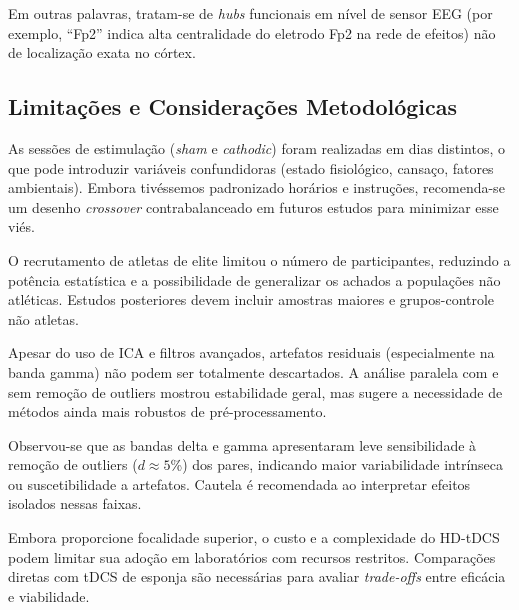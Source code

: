 Em outras palavras, tratam-se de \textit{hubs} funcionais em nível de sensor EEG (por exemplo, ``Fp2'' indica alta centralidade do eletrodo Fp2 na rede de efeitos) não de localização exata no córtex.

\subsection{Limitações e Considerações Metodológicas}
As sessões de estimulação (\textit{sham} e \textit{cathodic}) foram realizadas em dias distintos, o que pode introduzir variáveis confundidoras (estado fisiológico, cansaço, fatores ambientais). Embora tivéssemos padronizado horários e instruções, recomenda-se um desenho \textit{crossover} contrabalanceado em futuros estudos para minimizar esse viés.

O recrutamento de atletas de elite limitou o número de participantes, reduzindo a potência estatística e a possibilidade de generalizar os achados a populações não atléticas. Estudos posteriores devem incluir amostras maiores e grupos-controle não atletas.

Apesar do uso de ICA e filtros avançados, artefatos residuais (especialmente na banda gamma) não podem ser totalmente descartados. A análise paralela com e sem remoção de outliers mostrou estabilidade geral, mas sugere a necessidade de métodos ainda mais robustos de pré-processamento.

Observou-se que as bandas delta e gamma apresentaram leve sensibilidade à remoção de outliers (\(d\approx5\)\%) dos pares, indicando maior variabilidade intrínseca ou suscetibilidade a artefatos. Cautela é recomendada ao interpretar efeitos isolados nessas faixas.

Embora proporcione focalidade superior, o custo e a complexidade do HD-tDCS podem limitar sua adoção em laboratórios com recursos restritos. Comparações diretas com tDCS de esponja são necessárias para avaliar \textit{trade-offs} entre eficácia e viabilidade.